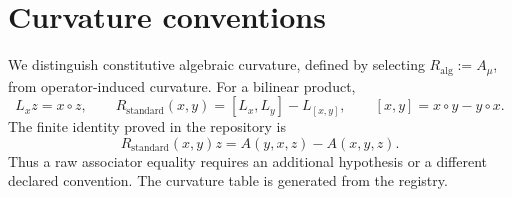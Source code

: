 \section{Curvature conventions}

We distinguish constitutive algebraic curvature, defined by selecting $R_{\mathrm{alg}}:=A_\mu$, from operator-induced curvature. For a bilinear product,
\[
L_xz=x\circ z,\qquad R_{\mathrm{standard}}(x,y)=[L_x,L_y]-L_{[x,y]},\qquad [x,y]=x\circ y-y\circ x.
\]
The finite identity proved in the repository is
\[
R_{\mathrm{standard}}(x,y)z=A(y,x,z)-A(x,y,z).
\]
Thus a raw associator equality requires an additional hypothesis or a different declared convention. The curvature table is generated from the registry.



